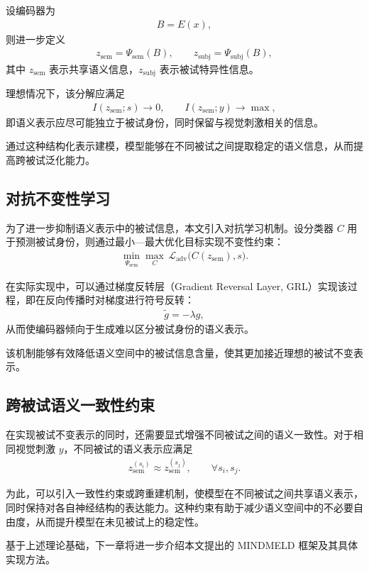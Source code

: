 设编码器为
\begin{align}
  B = E(x),
\end{align}
则进一步定义
\begin{align}
  z_{\mathrm{sem}} = \Psi_{\mathrm{sem}}(B), \qquad z_{\mathrm{subj}} = \Psi_{\mathrm{subj}}(B),
\end{align}
其中 $z_{\mathrm{sem}}$ 表示共享语义信息，$z_{\mathrm{subj}}$ 表示被试特异性信息。

理想情况下，该分解应满足
\begin{align}
  I(z_{\mathrm{sem}};s) \to 0, \qquad I(z_{\mathrm{sem}};y) \to \max,
\end{align}
即语义表示应尽可能独立于被试身份，同时保留与视觉刺激相关的信息。

通过这种结构化表示建模，模型能够在不同被试之间提取稳定的语义信息，从而提高跨被试泛化能力。

\subsection{对抗不变性学习}

为了进一步抑制语义表示中的被试信息，本文引入对抗学习机制。设分类器 $C$ 用于预测被试身份，则通过最小—最大优化目标实现不变性约束：
\begin{align}
  \min_{\Psi_{\mathrm{sem}}} \max_{C} \, \mathcal{L}_{\mathrm{adv}}\bigl(C(z_{\mathrm{sem}}), s\bigr).
\end{align}

在实际实现中，可以通过梯度反转层（Gradient Reversal Layer, GRL）实现该过程，即在反向传播时对梯度进行符号反转：
\begin{align}
  \tilde{g} = -\lambda g,
\end{align}
从而使编码器倾向于生成难以区分被试身份的语义表示。

该机制能够有效降低语义空间中的被试信息含量，使其更加接近理想的被试不变表示。

\subsection{跨被试语义一致性约束}

在实现被试不变表示的同时，还需要显式增强不同被试之间的语义一致性。对于相同视觉刺激 $y$，不同被试的语义表示应满足
\begin{align}
  z_{\mathrm{sem}}^{(s_i)} \approx z_{\mathrm{sem}}^{(s_j)}, \qquad \forall s_i,s_j.
\end{align}

为此，可以引入一致性约束或跨重建机制，使模型在不同被试之间共享语义表示，同时保持对各自神经结构的表达能力。这种约束有助于减少语义空间中的不必要自由度，从而提升模型在未见被试上的稳定性。

基于上述理论基础，下一章将进一步介绍本文提出的 MINDMELD 框架及其具体实现方法。

\chapterbib